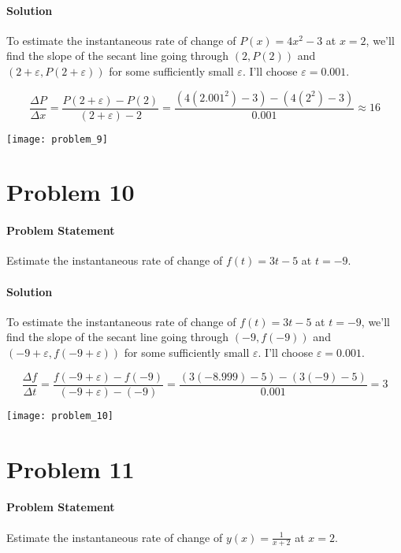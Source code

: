 \documentclass{article}
\begin{document}
  \paragraph{Solution} To estimate the instantaneous rate of change of \(P(x) = 4x^2 - 3\) at \(x=2\), we'll find the slope of the secant line going through \((2, P(2)) \) and \( (2 + \varepsilon, P(2 + \varepsilon)) \) for some sufficiently small \(\varepsilon\). I'll choose \(\varepsilon = 0.001\).

  \begin{equation}
    \frac{\Delta{P}}{\Delta{x}} = \frac{P(2+\varepsilon)-P(2)}{(2+\varepsilon) - 2} = \frac{(4(2.001^2)-3) - (4(2^2)-3)}{0.001} \approx \boxed{16}
  \end{equation}

  \texttt{[image: problem\_9]}
  \newpage

  \section{Problem 10}
  \paragraph{Problem Statement} Estimate the instantaneous rate of change of \(f(t) = 3t-5\) at \(t=-9\).

  \paragraph{Solution} To estimate the instantaneous rate of change of \(f(t) = 3t-5\) at \(t=-9\), we'll find the slope of the secant line going through \((-9, f(-9)) \) and \( (-9 + \varepsilon, f(-9 + \varepsilon)) \) for some sufficiently small \(\varepsilon\). I'll choose \(\varepsilon = 0.001\).

  \begin{equation}
    \frac{\Delta{f}}{\Delta{t}} = \frac{f(-9+\varepsilon)-f(-9)}{(-9+\varepsilon) - (-9)} = \frac{(3(-8.999)-5) - (3(-9)-5)}{0.001} = \boxed{3}
  \end{equation}

  \texttt{[image: problem\_10]}
  \newpage

  \section{Problem 11}
  \paragraph{Problem Statement} Estimate the instantaneous rate of change of \(y(x) = \frac{1}{x+2}\) at \(x=2\).
\end{document}
